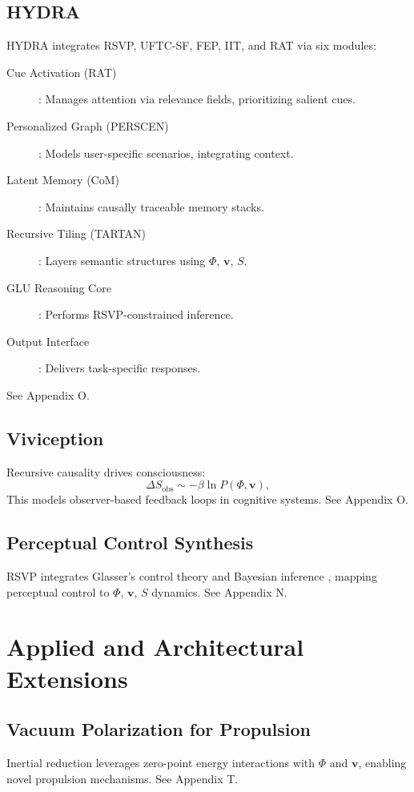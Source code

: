 \documentclass[12pt]{report}
\newcommand{\PhiRSVP}{\Phi}
\newcommand{\vRSVP}{\mathbf{v}}
\newcommand{\SRSVP}{S}
\begin{document}
\chapter{HYDRA}
HYDRA integrates RSVP, UFTC-SF, FEP, IIT, and RAT via six modules:
\begin{description}
    \item[Cue Activation (RAT)]: Manages attention via relevance fields, prioritizing salient cues.
    \item[Personalized Graph (PERSCEN)]: Models user-specific scenarios, integrating context.
    \item[Latent Memory (CoM)]: Maintains causally traceable memory stacks.
    \item[Recursive Tiling (TARTAN)]: Layers semantic structures using \(\PhiRSVP\), \(\vRSVP\), \(\SRSVP\).
    \item[GLU Reasoning Core]: Performs RSVP-constrained inference.
    \item[Output Interface]: Delivers task-specific responses.
\end{description}
See Appendix O.

\chapter{Viviception}
Recursive causality drives consciousness:
\begin{equation}
\Delta \SRSVP_{\text{obs}} \sim -\beta \ln P(\PhiRSVP, \vRSVP), \label{eq:viviception}
\end{equation}
This models observer-based feedback loops in cognitive systems. See Appendix O.

\chapter{Perceptual Control Synthesis}
RSVP integrates Glasser’s control theory \citep{Glasser1985} and Bayesian inference \citep{Friston2010}, mapping perceptual control to \(\PhiRSVP\), \(\vRSVP\), \(\SRSVP\) dynamics. See Appendix N.

\part{Applied and Architectural Extensions}

\chapter{Vacuum Polarization for Propulsion}
Inertial reduction leverages zero-point energy interactions with \(\PhiRSVP\) and \(\vRSVP\), enabling novel propulsion mechanisms. See Appendix T.
\end{document}
